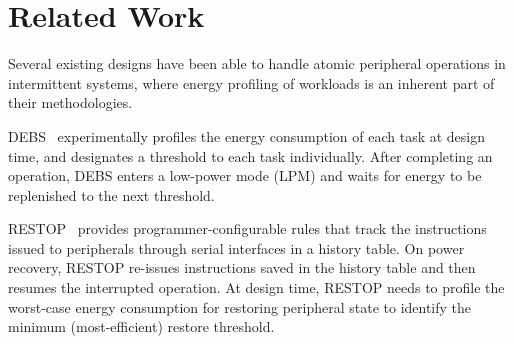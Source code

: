 \section{Related Work}




Several existing designs have been able to handle atomic peripheral operations in intermittent systems, where energy profiling of workloads is an inherent part of their methodologies.

DEBS~\cite{gomez2016dynamic} experimentally profiles the energy consumption of each task at design time, and designates a threshold to each task individually.
After completing an operation, DEBS enters a low-power mode (LPM) and waits for energy to be replenished to the next threshold. 

RESTOP~\cite{rodriguez2018restop} provides programmer-configurable rules that track the instructions issued to peripherals through serial interfaces in a history table.
On power recovery, RESTOP re-issues instructions saved in the history table and then resumes the interrupted operation. 
At design time, RESTOP needs to profile the worst-case energy consumption for restoring peripheral state to identify the minimum (most-efficient) restore threshold. 

